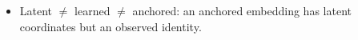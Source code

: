 \begin{itemize}
    \item Latent $\neq$ learned $\neq$ anchored: an anchored embedding has latent coordinates but an observed identity. 

\end{itemize}
